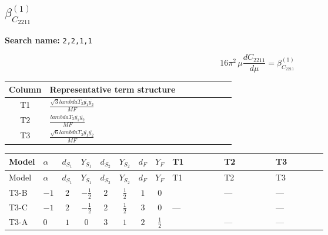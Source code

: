 \documentclass[8pt]{article}
\begin{document}
\begin{landscape}
\section*{$\beta_{C_{2211}}^{(1)}$}
\noindent\textbf{Search name: }\texttt{2,2,1,1}\par\smallskip
\[16\pi^2\,\mu\frac{d C_{2211}}{d\mu}=\beta_{C_{2211}}^{(1)}\]
\begin{center}
\begin{tabular}{@{}c >{\raggedright\arraybackslash}p{0.82\linewidth}@{}}
\toprule
Column & Representative term structure \\
\midrule
T1 & \(\displaystyle \frac{\sqrt{3} lambdaT_{3} \overline{y_{1}} \overline{y_{2}}}{MF}\) \\
\midrule
T2 & \(\displaystyle \frac{lambdaT_{3} \overline{y_{1}} \overline{y_{2}}}{MF}\) \\
\midrule
T3 & \(\displaystyle \frac{\sqrt{6} lambdaT_{3} \overline{y_{1}} \overline{y_{2}}}{MF}\) \\
\midrule
\bottomrule
\end{tabular}
\end{center}
\smallskip
\tiny
\begin{longtable}{@{}llcccccc >{\raggedright\arraybackslash}p{0.21\linewidth} >{\raggedright\arraybackslash}p{0.21\linewidth} >{\raggedright\arraybackslash}p{0.21\linewidth}@{}}
\toprule
Model & $\alpha$ & $d_{S_1}$ & $Y_{S_1}$ & $d_{S_2}$ & $Y_{S_2}$ & $d_F$ & $Y_F$ & T1 & T2 & T3 \\
\midrule
\endfirsthead
\toprule
Model & $\alpha$ & $d_{S_1}$ & $Y_{S_1}$ & $d_{S_2}$ & $Y_{S_2}$ & $d_F$ & $Y_F$ & T1 & T2 & T3 \\
\midrule
\endhead
T3-B & $-1$ & $2$ & $-\frac{1}{2}$ & $2$ & $\frac{1}{2}$ & $1$ & $0$ & \scriptsize\adjustbox{max width=\linewidth}{$\begin{gathered} \frac{2 \sqrt{3} lambdaT_{3} \overline{y_{1}} \overline{y_{2}}}{3 MF}\end{gathered}$} & --- & --- \\
\midrule
T3-C & $-1$ & $2$ & $-\frac{1}{2}$ & $2$ & $\frac{1}{2}$ & $3$ & $0$ & --- & \scriptsize\adjustbox{max width=\linewidth}{$\begin{gathered} - \frac{2 lambdaT_{3} \overline{y_{1}} \overline{y_{2}}}{3 MF}\end{gathered}$} & --- \\
\midrule
T3-A & $0$ & $1$ & $0$ & $3$ & $1$ & $2$ & $\frac{1}{2}$ & \scriptsize\adjustbox{max width=\linewidth}{$\begin{gathered} \frac{2 \sqrt{3} lambdaT_{3} \overline{y_{1}} \overline{y_{2}}}{3 MF}\end{gathered}$} & --- & --- \\

\end{longtable}
\end{landscape}
\end{document}
